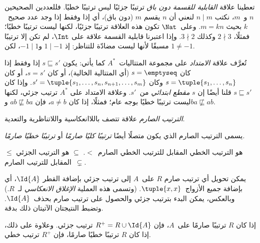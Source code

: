 \documentclass[../../../include/open-logic-section]{subfiles}
\begin{document}
\begin{ex}
تعطينا علاقة \emph{القابلية للقسمة دون باق} ترتيبًا جزئيًا ليس ترتيبًا
خطيًا. فللعددين الصحيحين $n$ و~$m$، نكتب $n \mid m$ لنعني أن $n$ يقسم
$m$ (دون باق)، أي إذا وفقط إذا وجد عدد صحيح~$k$ بحيث $m = kn$. وعلى~$\Nat$
تكون هذه العلاقة ترتيبًا جزئيًا، لكنها ليست ترتيبًا خطيًا؛ فمثلًا،
$2 \nmid 3$ وكذلك $3 \nmid 2$. وإذا اعتبرنا قابلية القسمة علاقة على
$\Int$، لم تكن إلا ترتيبًا مسبقًا لأنها ليست مضادّة للتناظر: إذ
$1 \mid -1$ و$-1 \mid 1$، لكن $1 \neq -1$.
\end{ex}

\begin{ex}
تُعرَّف علاقة \emph{الامتداد} على مجموعة المتتاليات~$A^*$ كما يأتي:
يكون $s \sqsubseteq s'$ إذا وفقط إذا كان $s = \emptyseq$ (أي المتتالية
الخالية)، أو كان $s = s'$، أو كان $s = \tuple{s_1, \dots, s_n}$ وكان
$s' = \tuple{s_1, \dots, s_n, s_{n+1}, \dots, s_m}$. وإذا كان
$s \sqsubseteq s'$ قلنا أيضًا إن $s$ \emph{مقطع ابتدائي} من~$s'$.
وعلاقة الامتداد على $A^*$ ترتيب جزئي، لكنها ليست ترتيبًا خطيًا بوجه عام؛ فمثلًا،
إذا كان $a \neq b$، فإن $ab \not\sqsubseteq ba$ و$ba \not\sqsubseteq ab$.
\end{ex}

\begin{defn}
\emph{الترتيب الصارم} علاقة تتصف باللاانعكاسية واللاتناظرية والتعدية.
\end{defn}

\begin{defn}
يسمى الترتيب الصارم الذي يكون متصلًا أيضًا
\emph{ترتيبًا كليًا صارمًا} أو \emph{ترتيبًا خطيًا صارمًا.}
\end{defn}

\begin{ex}
$\le$ هو الترتيب الخطي المقابل للترتيب الخطي الصارم~$<$.
$\subseteq$ هو الترتيب الجزئي المقابل للترتيب الصارم~$\subsetneq$.
\end{ex}

يمكن تحويل أي ترتيب صارم $R$ على~$A$ إلى ترتيب جزئي بإضافة القطر
$\Id{A}$، أي بإضافة جميع الأزواج~$\tuple{x, x}$. (وتسمى هذه العملية
\emph{الإغلاق الانعكاسي} لـ~$R$.) وبالعكس، يمكن البدء بترتيب جزئي والحصول
على ترتيب صارم بحذف~$\Id{A}$. وتضبط النتيجتان الآتيتان ذلك بدقة.

\begin{prop}
إذا كان $R$ ترتيبًا صارمًا على~$A$، فإن $R^+ = R \cup \Id{A}$ ترتيب
جزئي. وعلاوة على ذلك، إذا كان $R$ ترتيبًا خطيًا صارمًا، فإن $R^+$ ترتيب
خطي.
\end{prop}
\end{document}
